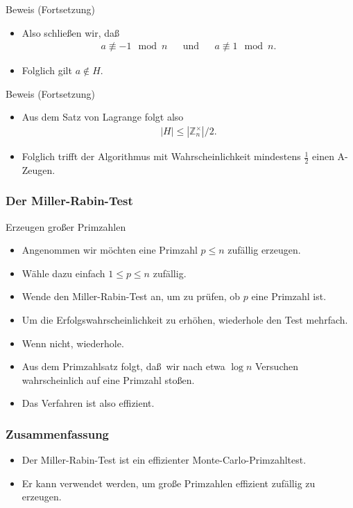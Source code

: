 \documentclass{beamer}
\newcommand\ZZ{\mathbb Z}
\renewcommand{\ae}{\"a}
\renewcommand{\oe}{\"o}
\newcommand{\ue}{\"u}
\begin{document}
\begin{frame}
\begin{overprint}
\begin{block}{Beweis (Fortsetzung)}
\begin{itemize}
				\item Also schlie\ss en wir, da\ss
					\begin{align*}
						a\not\equiv-1\mod n&&\mbox{und}&&a\not\equiv1\mod n.
					\end{align*}
				\item Folglich gilt $a\not\in H$.	
			\end{itemize}
		\end{block}
		\begin{block}{Beweis (Fortsetzung)}
			\begin{itemize}
				\item Aus dem Satz von Lagrange folgt also
					\begin{align*}
						|H|\leq|\ZZ_n^\times|/2.
					\end{align*}
				\item Folglich trifft der Algorithmus mit Wahrscheinlichkeit mindestens $\frac{1}{2}$ einen A-Zeugen.
			\end{itemize}
		\end{block}
	\end{overprint}
\end{frame}

\begin{frame}\frametitle{Der Miller-Rabin-Test}
\begin{block}{Erzeugen gro\ss er Primzahlen}
\begin{itemize}
\item Angenommen wir m\oe chten eine Primzahl $p\leq n$ zuf\ae llig erzeugen.
\item W\ae hle dazu einfach $1\leq p\leq n$ zuf\ae llig.
\item Wende den Miller-Rabin-Test an, um zu pr\ue fen, ob $p$ eine Primzahl ist.
\item Um die Erfolgswahrscheinlichkeit zu erh\oe hen, wiederhole den Test mehrfach.
\item Wenn nicht, wiederhole.
\item Aus dem Primzahlsatz folgt, da\ss\ wir nach etwa $\log n$ Versuchen wahrscheinlich auf eine Primzahl sto\ss en.
\item Das Verfahren ist also effizient.
\end{itemize}
\end{block}
\end{frame}

\begin{frame}\frametitle{Zusammenfassung}
\begin{itemize}
\item Der Miller-Rabin-Test ist ein effizienter Monte-Carlo-Primzahltest.
\item Er kann verwendet werden, um gro\ss e Primzahlen effizient zuf\ae llig zu erzeugen.
\end{itemize}
\end{frame}
\end{document}

